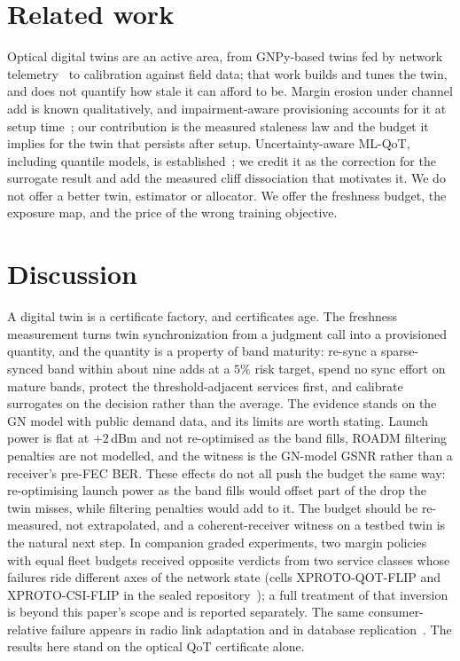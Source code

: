 \documentclass[letterpaper,10pt]{article}
\begin{document}
\section{Related work}
Optical digital twins are an active area, from GNPy-based twins fed by network
telemetry~\cite{dtwin} to calibration against field data; that work builds and
tunes the twin, and does not quantify how stale it can afford to be. Margin erosion
under channel add is known qualitatively, and impairment-aware provisioning
accounts for it at setup time~\cite{pointon}; our contribution is the measured
staleness law and the budget it implies for the twin that persists after setup.
Uncertainty-aware ML-QoT, including quantile models, is
established~\cite{quantileqot,mlqot}; we credit it as the correction for the
surrogate result and add the measured cliff dissociation that motivates it. We do
not offer a better twin, estimator or allocator. We offer the freshness budget, the
exposure map, and the price of the wrong training objective.

\section{Discussion}
A digital twin is a certificate factory, and certificates age. The freshness
measurement turns twin synchronization from a judgment call into a provisioned
quantity, and the quantity is a property of band maturity: re-sync a
sparse-synced band within about nine adds at a $5\%$ risk target, spend no
sync effort on mature bands, protect the threshold-adjacent services first, and
calibrate surrogates on the decision rather than the average. The evidence stands on the GN model with public demand data, and its
limits are worth stating. Launch power is flat at $+2$\,dBm and not re-optimised as
the band fills, ROADM filtering penalties are not modelled, and the witness is the
GN-model GSNR rather than a receiver's pre-FEC BER. These effects do not all push
the budget the same way: re-optimising launch power as the band fills would offset
part of the drop the twin misses, while filtering penalties would add to it. The
budget should be re-measured, not extrapolated, and a coherent-receiver witness on
a testbed twin is the natural next step. In companion graded experiments, two
margin policies with equal fleet budgets received opposite verdicts from two
service classes whose failures ride different axes of the network state (cells
XPROTO-QOT-FLIP and XPROTO-CSI-FLIP in the sealed
repository~\cite{otcampaigns}); a full treatment of that inversion is beyond this
paper's scope and is reported separately. The same consumer-relative failure
appears in radio link adaptation and in database
replication~\cite{otcampaigns}. The results here stand on the optical QoT
certificate alone.
\end{document}
